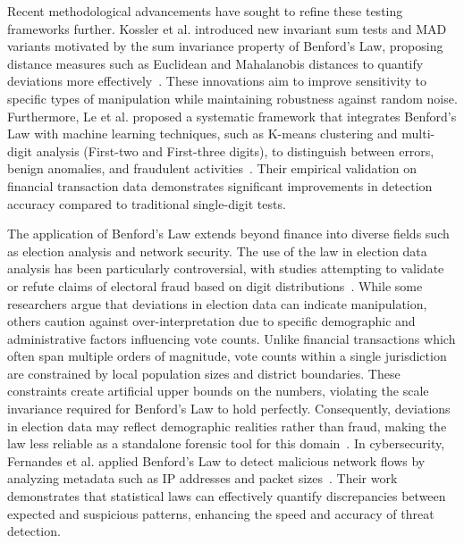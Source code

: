 \documentclass[11pt,a4paper]{article}
\begin{document}
Recent methodological advancements have sought to refine these testing frameworks further. Kossler et al. introduced new invariant sum tests and MAD variants motivated by the sum invariance property of Benford's Law, proposing distance measures such as Euclidean and Mahalanobis distances to quantify deviations more effectively~\cite{Kossler2024SomeNI}. These innovations aim to improve sensitivity to specific types of manipulation while maintaining robustness against random noise. Furthermore, Le et al. proposed a systematic framework that integrates Benford's Law with machine learning techniques, such as K-means clustering and multi-digit analysis (First-two and First-three digits), to distinguish between errors, benign anomalies, and fraudulent activities~\cite{Le2024BenfordsLA}. Their empirical validation on financial transaction data demonstrates significant improvements in detection accuracy compared to traditional single-digit tests.

The application of Benford's Law extends beyond finance into diverse fields such as election analysis and network security. The use of the law in election data analysis has been particularly controversial, with studies attempting to validate or refute claims of electoral fraud based on digit distributions~\cite{Tosic2021UseOB}. While some researchers argue that deviations in election data can indicate manipulation, others caution against over-interpretation due to specific demographic and administrative factors influencing vote counts. Unlike financial transactions which often span multiple orders of magnitude, vote counts within a single jurisdiction are constrained by local population sizes and district boundaries. These constraints create artificial upper bounds on the numbers, violating the scale invariance required for Benford's Law to hold perfectly. Consequently, deviations in election data may reflect demographic realities rather than fraud, making the law less reliable as a standalone forensic tool for this domain~\cite{Tosic2021UseOB}. In cybersecurity, Fernandes et al. applied Benford's Law to detect malicious network flows by analyzing metadata such as IP addresses and packet sizes~\cite{Fernandes2024UnveilingMN}. Their work demonstrates that statistical laws can effectively quantify discrepancies between expected and suspicious patterns, enhancing the speed and accuracy of threat detection.
\end{document}
